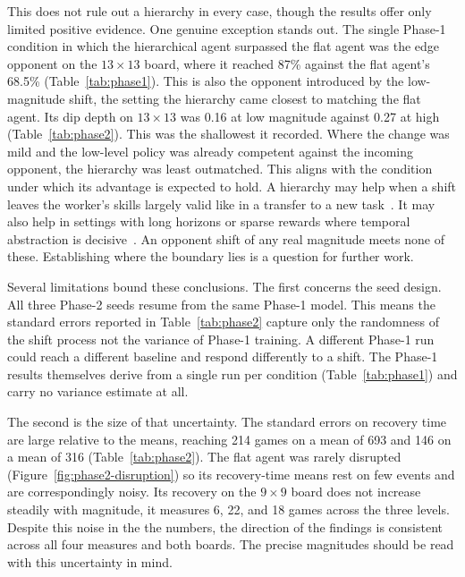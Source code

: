 \documentclass[sigconf,nonacm]{acmart}
\begin{document}
This does not rule out a hierarchy in every case, though the results offer only limited positive evidence. One genuine exception stands out. The single Phase-1 condition in which the hierarchical agent surpassed the flat agent was the edge opponent on the $13\times13$ board, where it reached 87\% against the flat agent's 68.5\% (Table~\ref{tab:phase1}). This is also the opponent introduced by the low-magnitude shift, the setting the hierarchy came closest to matching the flat agent. Its dip depth on $13\times13$ was 0.16 at low magnitude against 0.27 at high (Table~\ref{tab:phase2}). This was the shallowest it recorded. Where the change was mild and the low-level policy was already competent against the incoming opponent, the hierarchy was least outmatched. This aligns with the condition under which its advantage is expected to hold. A hierarchy may help when a shift leaves the worker's skills largely valid like in a transfer to a new task~\cite{vezhnevets2017feudal}. It may also help in settings with long horizons or sparse rewards where temporal abstraction is decisive~\cite{kulkarni2016hierarchical, sutton1999between}. An opponent shift of any real magnitude meets none of these. Establishing where the boundary lies is a question for further work.

\medskip


Several limitations bound these conclusions. The first concerns the seed design. All three Phase-2 seeds resume from the same Phase-1 model. This means the standard errors reported in Table~\ref{tab:phase2} capture only the randomness of the shift process not the variance of Phase-1 training. A different Phase-1 run could reach a different baseline and respond differently to a shift. The Phase-1 results themselves derive from a single run per condition (Table~\ref{tab:phase1}) and carry no variance estimate at all.

The second is the size of that uncertainty. The standard errors on recovery time are large relative to the means, reaching 214 games on a mean of 693 and 146 on a mean of 316 (Table~\ref{tab:phase2}). The flat agent was rarely disrupted (Figure~\ref{fig:phase2-disruption}) so its recovery-time means rest on few events and are correspondingly noisy. Its recovery on the $9\times9$ board does not increase steadily with magnitude, it measures 6, 22, and 18 games across the three levels. Despite this noise in the the numbers, the direction of the findings is consistent across all four measures and both boards. The precise magnitudes should be read with this uncertainty in mind.
\end{document}
